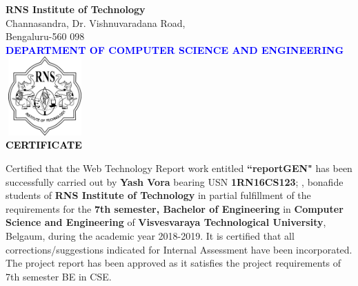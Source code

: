 \thispagestyle{empty}
\begin{center}

\textup{\large {\textcolor{darkbrown}{\bf RNS Institute of Technology}} \\ 
\normalsize{\textcolor{darkbrown}{Channasandra, Dr. Vishnuvaradana Road,\\ Bengaluru-560 098}}}\\[0.1in]
\textup{\normalsize {\textcolor{blue}{\bf DEPARTMENT OF COMPUTER SCIENCE AND ENGINEERING}}}\\[0.1in]
\includegraphics[width=3cm, height=3cm]{../static/media/RNS_logo.png}\\[0.1in]
\textup{\large {\textcolor{black}{\textbf {CERTIFICATE}}}} \\[0.1in]
\end{center}

\begin{minipage}{14.8cm}
Certified that the Web Technology Report work entitled \textbf{``reportGEN"} has been successfully carried out by \textbf{Yash Vora} bearing USN \textbf{1RN16CS123};  , bonafide students of \textbf{RNS Institute of Technology} in partial fulfillment of the requirements for the \textbf{7th semester, Bachelor of Engineering} in \textbf{Computer Science and Engineering} of \textbf{Visvesvaraya Technological University}, Belgaum, during the academic year 2018-2019. It is certified that all corrections/suggestions indicated for Internal Assessment have been incorporated. The project report has been approved as it satisfies the project requirements of 7th semester BE in CSE.\\[0.4in]
\end{minipage}

